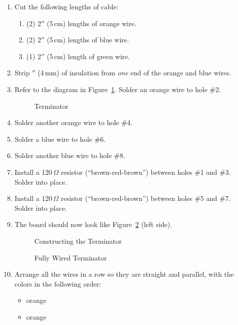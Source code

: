 \documentclass[letterpaper,twoside,onecolumn,openright,final]{memoir}
\begin{document}
\begin{enumerate}
\item	Cut the following lengths of  cable:
	\begin{enumerate}
	\item	(2) 2$''$ (5\,cm) lengths of orange wire.
	\item	(2) 2$''$ (5\,cm) lengths of blue wire.
	\item	(1) 2$''$ (5\,cm) length of green wire.
	\end{enumerate}
\item	Strip $''$ (4\,mm) of insulation from \emph{one} end of the orange and blue
	wires.
\item	Refer to the diagram in Figure~\ref{fig:terminator-pcb}.  Solder an orange wire to 
	hole \#2.
\begin{figure}
\caption{Terminator \label{fig:terminator-pcb}}
\end{figure}
\item	Solder another orange wire to hole \#4.
\item	Solder a blue wire to hole \#6.
\item	Solder another blue wire to hole \#8.
\item	Install a 120\,$\Omega$ resistor (``brown-red-brown'') between holes \#1 and \#3.  Solder
	into place.
\item	Install a 120\,$\Omega$ resistor (``brown-red-brown'') between holes \#5 and \#7.  Solder
	into place.
\item 	The board should now look like Figure~\ref{fig:terminator-construction} (left side).
\begin{figure}
 \centerfloat
 \caption{Constructing the Terminator\label{fig:terminator-construction}}
\end{figure}
\begin{figure}
 \centerfloat
 \caption{Fully Wired Terminator\label{fig:terminator-pcb-wired}}
\end{figure}
\item	Arrange all the wires in a row so they are straight and parallel, with the colors in
	the following order:
	\begin{itemize}
	\item	orange
	\item	orange

\end{itemize}
\end{enumerate}
\end{document}
